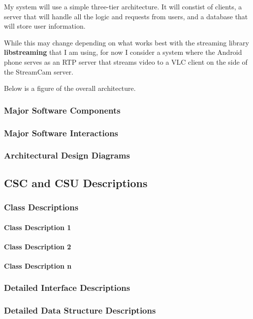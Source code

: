 \documentclass[11pt,a4paper,titlepage]{article}
\begin{document}
My system will use a simple three-tier architecture. It will constist of clients, a server that will handle all the logic and requests from users, and a database that will store user information. 

While this may change depending on what works best with the streaming library \textbf{libstreaming} that I am using, for now I consider a system where the Android phone serves as an RTP server that streams video to a VLC client on the side of the StreamCam server. 

Below is a figure of the overall architecture.

\subsubsection{Major Software Components}
\subsubsection{Major Software Interactions}
\subsubsection{Architectural Design Diagrams}
\subsection{CSC and CSU Descriptions}
\subsubsection{Class Descriptions}
\paragraph{Class Description 1}
\paragraph{Class Description 2}
\paragraph{Class Description n}
\subsubsection{Detailed Interface Descriptions}
\subsubsection{Detailed Data Structure Descriptions}
\end{document}
